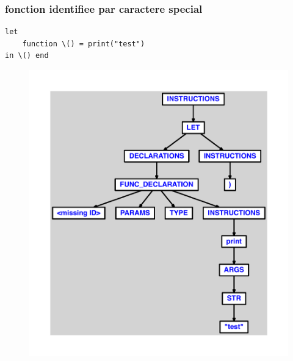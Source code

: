 \documentclass{article}
\begin{document}
\subsubsection{fonction identifiee par caractere special}
\begin{lstlisting}
let
	function \() = print("test")
in \() end
\end{lstlisting}
\newpage
\begin{figure}[H]
\centering
\includegraphics[max width=\textwidth]{ast/ast_213.pdf}
\end{figure}
\newpage
\end{document}
